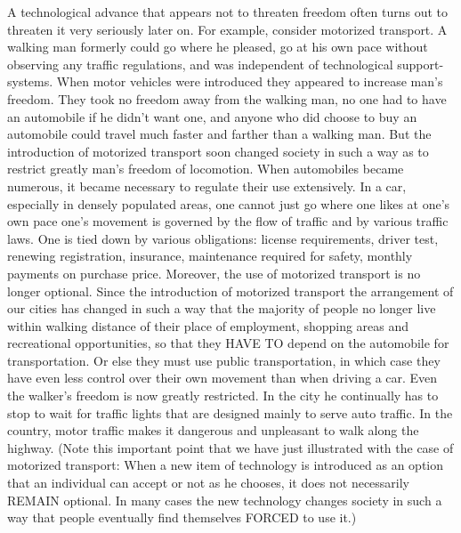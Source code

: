  A technological advance that appears not to threaten freedom often turns out to threaten it very seriously later on. For example, consider motorized transport. A walking man formerly could go where he pleased, go at his own pace without observing any traffic regulations, and was independent of technological support-systems. When motor vehicles were introduced they appeared to increase man’s freedom. They took no freedom away from the walking man, no one had to have an automobile if he didn’t want one, and anyone who did choose to buy an automobile could travel much faster and farther than a walking man. But the introduction of motorized transport soon changed society in such a way as to restrict greatly man’s freedom of locomotion. When automobiles became numerous, it became necessary to regulate their use extensively. In a car, especially in densely populated areas, one cannot just go where one likes at one’s own pace one’s movement is governed by the flow of traffic and by various traffic laws. One is tied down by various obligations: license requirements, driver test, renewing registration, insurance, maintenance required for safety, monthly payments on purchase price. Moreover, the use of motorized transport is no longer optional. Since the introduction of motorized transport the arrangement of our cities has changed in such a way that the majority of people no longer live within walking distance of their place of employment, shopping areas and recreational opportunities, so that they HAVE TO depend on the automobile for transportation. Or else they must use public transportation, in which case they have even less control over their own movement than when driving a car. Even the walker’s freedom is now greatly restricted. In the city he continually has to stop to wait for traffic lights that are designed mainly to serve auto traffic. In the country, motor traffic makes it dangerous and unpleasant to walk along the highway. (Note this important point that we have just illustrated with the case of motorized transport: When a new item of technology is introduced as an option that an individual can accept or not as he chooses, it does not necessarily REMAIN optional. In many cases the new technology changes society in such a way that people eventually find themselves FORCED to use it.)


